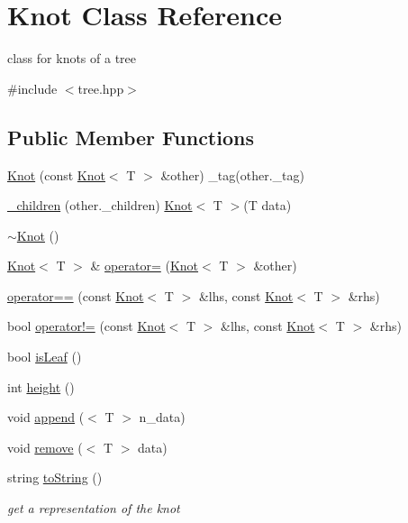 \hypertarget{class_knot}{\section{\-Knot \-Class \-Reference}
\label{class_knot}
}


class for knots of a tree  




{\ttfamily \#include $<$tree.\-hpp$>$}

\subsection*{\-Public \-Member \-Functions}
\begin{DoxyCompactItemize}
\item 
\hyperlink{class_knot_a92883dc27430396af88d6e8a0b216d7d}{\-Knot} (const \hyperlink{class_knot}{\-Knot}$<$ \-T $>$ \&other) \-\_\-tag(other.\-\_\-tag)
\item 
\hyperlink{class_knot_a4fbe6a4a6f834298c0972a11c49a100c}{\-\_\-children} (other.\-\_\-children) \hyperlink{class_knot}{\-Knot}$<$ \-T $>$(\-T data)
\item 
\hyperlink{class_knot_abe4462897569b79486b2b6cac03c3702}{$\sim$\-Knot} ()
\item 
\hyperlink{class_knot}{\-Knot}$<$ \-T $>$ \& \hyperlink{class_knot_a2229333e1b081402213d600dd7c3b43d}{operator=} (\hyperlink{class_knot}{\-Knot}$<$ \-T $>$ \&other)
\item 
\hyperlink{class_knot_a37de81d6b6172c19435fcf0f11658bc3}{operator==} (const \hyperlink{class_knot}{\-Knot}$<$ \-T $>$ \&lhs, const \hyperlink{class_knot}{\-Knot}$<$ \-T $>$ \&rhs)
\item 
bool \hyperlink{class_knot_a9d051c01a870a9071e4adede8d79af65}{operator!=} (const \hyperlink{class_knot}{\-Knot}$<$ \-T $>$ \&lhs, const \hyperlink{class_knot}{\-Knot}$<$ \-T $>$ \&rhs)
\item 
bool \hyperlink{class_knot_a68386ab11edd866495dfbcf61cab0e01}{is\-Leaf} ()
\item 
int \hyperlink{class_knot_a9988255f899344c9f16797c4b918ac7b}{height} ()
\item 
void \hyperlink{class_knot_aa941112b1a0d38362bc4a1f632ecd35f}{append} ($<$ \-T $>$ n\-\_\-data)
\item 
void \hyperlink{class_knot_a96d632680a9180028a743cb9c36999fd}{remove} ($<$ \-T $>$ data)
\item 
string \hyperlink{class_knot_af8b780d91b4f2a43556c7b53c8f6243c}{to\-String} ()
\begin{DoxyCompactList}\small\item\em get a representation of the knot \end{DoxyCompactList}\end{DoxyCompactItemize}


